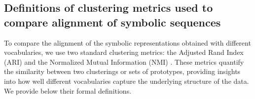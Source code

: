     







    \subsection{Definitions of clustering metrics used to compare alignment of symbolic sequences}
    \label{apd:chapter_5_clustering_metrics_definitions}

    To compare the alignment of the symbolic representations obtained with different vocabularies, we use two standard clustering metrics: the Adjusted Rand Index (ARI) \cite{Hubert1985} and the Normalized Mutual Information (NMI) \cite{Lancichinetti2009}. These metrics quantify the similarity between two clusterings or sets of prototypes, providing insights into how well different vocabularies capture the underlying structure of the data. We provide below their formal definitions.

